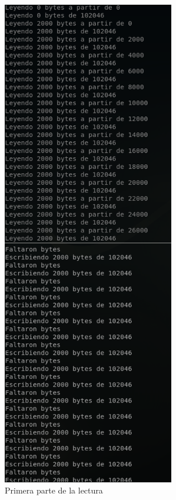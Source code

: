 \documentclass[12pt,journal,compsoc]{IEEEtran}
\begin{document}
\begin{figure}[H]
  \centering
  \includegraphics[width=75mm]{images/punto-3/read/2-start-read.png}
  \caption{Primera parte de la lectura}
  \label{fig:start-read}
\end{figure}
\end{document}
